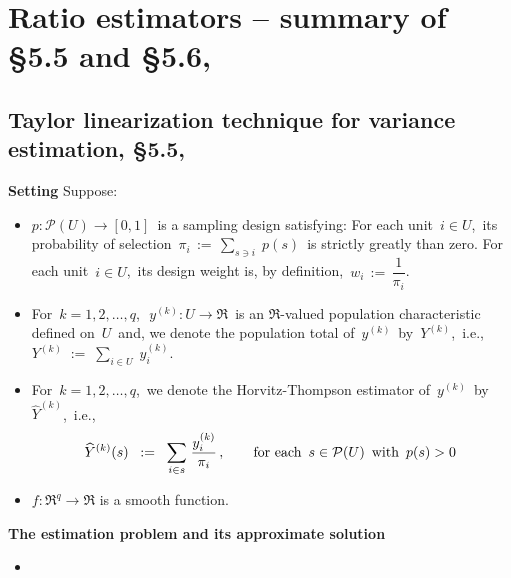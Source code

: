 

\section{Ratio estimators -- summary of \S5.5 and \S5.6, \cite{Sarndal1992}}


\subsection{Taylor linearization technique for variance estimation, \S5.5, \cite{Sarndal1992}}


\begin{proposition}
\mbox{}
\vskip 0.1cm
\noindent
\textbf{Setting}
\vskip 0.1cm
\noindent
Suppose:
\begin{itemize}
\item
    $p : \mathcal{P}(U) \longrightarrow [0,1]$\,
    is a sampling design satisfying:
    For each unit \,$i \in U$,\,
    its probability of selection
    \,$\pi_{i} \,:=\, \underset{s \ni i}{\sum}\;p(s)$\,
    is strictly greatly than zero.
    For each unit \,$i \in U$,\,
    its design weight is, by definition,
    \,$w_{i} \,:=\, \dfrac{1}{\pi_{i}}$.\,
\item
    For \,$k = 1, 2, \ldots, q$,\,
    \,$y^{(k)} : U \longrightarrow \Re$\,
    is an $\Re$-valued population characteristic defined on \,$U$\,
    and, we denote the population total of \,$y^{(k)}$\, by \,$Y^{(k)}$,\, i.e.,
    \,$Y^{(k)} \; := \; \underset{i \in U}{\sum}\;y^{(k)}_{i}$.\,
\item
    For \,$k = 1, 2, \ldots, q$,\,
    we denote the Horvitz-Thompson estimator of \,$y^{(k)}$\, by \,$\widehat{Y}^{(k)}$,\, i.e.,
    \begin{equation*}
    \widehat{Y}^{(k)}(s)
    \;\; := \;\;
        \underset{i \in s}{\sum}\;\dfrac{ y^{(k)}_{i} }{ \pi_{i} }\,,
    \quad\quad
    \textnormal{for each \,$s \in \mathcal{P}(U)$\, with \,$p(s) > 0$\,}
    \end{equation*}
\item
    $f : \Re^{q} \longrightarrow \Re$ is a smooth function.
\end{itemize}
\vskip 0.1cm
\noindent
\textbf{The estimation problem and its approximate solution}
\vskip 0.1cm
\noindent
\begin{itemize}
\item

\end{itemize}
\end{proposition}
